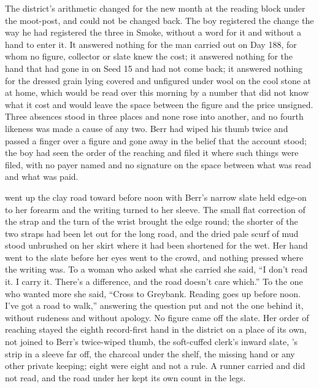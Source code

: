 The district's arithmetic changed for the new month at the reading block under the moot-post, and could not be changed back. The boy registered the change the way he had registered the three in Smoke, without a word for it and without a hand to enter it. It answered nothing for the man carried out on Day 188, for whom no figure, collector or slate knew the cost; it answered nothing for the hand that had gone in on Seed 15 and had not come back; it answered nothing for the dressed grain lying covered and unfigured under wool on the cool stone at  at home, which would be read over this morning by a number that did not know what it cost and would leave the space between the figure and the price unsigned. Three absences stood in three places and none rose into another, and no fourth likeness was made a cause of any two. Berr had wiped his thumb twice and passed a finger over a figure and gone away in the belief that the account stood; the boy had seen the order of the reaching and filed it where such things were filed, with no payer named and no signature on the space between what was read and what was paid.

 went up the clay road toward  before noon with Berr's narrow slate held edge-on to her forearm and the writing turned to her sleeve. The small flat correction of the strap and the turn of the wrist brought the edge round; the shorter of the two straps had been let out for the long road, and the dried pale scurf of mud stood unbrushed on her skirt where it had been shortened for the wet. Her hand went to the slate before her eyes went to the crowd, and nothing pressed where the writing was. To a woman who asked what she carried she said, “I don't read it. I carry it. There's a difference, and the road doesn't care which.” To the one who wanted more she said, “Cross to Greybank. Reading goes up before noon. I've got a road to walk,” answering the question put and not the one behind it, without rudeness and without apology. No figure came off the slate. Her order of reaching stayed the eighth record-first hand in the district on a place of its own, not joined to Berr's twice-wiped thumb, the soft-cuffed clerk's inward slate, 's strip in a sleeve far off, the charcoal under the shelf, the missing hand or any other private keeping; eight were eight and not a rule. A runner carried and did not read, and the road under her kept its own count in the legs.

